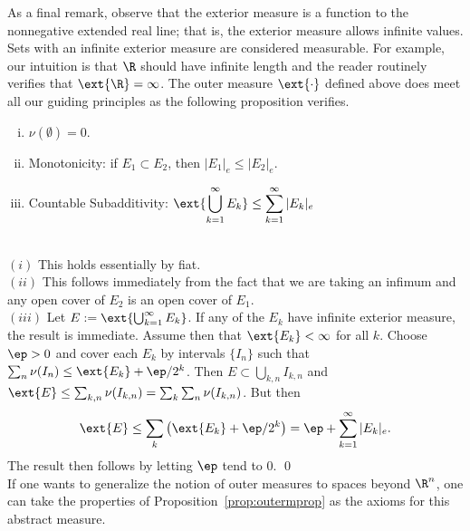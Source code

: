 As a final remark, observe that the exterior measure is a function to the nonnegative extended real line; that is, the exterior measure allows infinite values. Sets with an infinite exterior measure are considered measurable. For example, our intuition is that $\R$ should have infinite length and the reader routinely verifies that $\ext{\R}=\infty$. The outer measure $\ext{\cdot}$ defined above does meet all our guiding principles as the following proposition verifies. 

\begin{prop} \label{prop:outermprop} \hfill
	\begin{enumerate}[(i)]
	\item $\nu(\emptyset)=0$.
	\item Monotonicity: if $E_1 \subset E_2$, then $|E_1|_e \leq |E_2|_e$.
	\item Countable Subadditivity: $\displaystyle \ext{\bigcup_{k=1}^\infty E_k} \leq \sum_{k=1}^\infty |E_k|_e$
	\end{enumerate}
\end{prop}

\pf \\
\noindent$(i)$ This holds essentially by fiat. \\

\noindent$(ii)$ This follows immediately from the fact that we are taking an infimum and any open cover of $E_2$ is an open cover of $E_1$. \\

\noindent$(iii)$ Let $E:=\ext{\bigcup_{k=1}^\infty E_k}$. If any of the $E_k$ have infinite exterior measure, the result is immediate. Assume then that $\ext{E_k}<\infty$ for all $k$. Choose $\ep>0$ and cover each $E_k$ by intervals $\{I_n\}$ such that $\sum_n \nu(I_n) \leq \ext{E_k} + \ep/2^k$. Then $E \subset \bigcup_{k,n} I_{k,n}$ and $\ext{E} \leq \sum_{k,n} \nu(I_{k,n})= \sum_k \sum_n \nu(I_{k,n})$. But then 
	\[
	\ext{E} \leq \sum_k \left( \ext{E_k} + \ep/2^k \right)= \ep + \sum_{k=1}^\infty |E_k|_e.
	\]
The result then follows by letting $\ep$ tend to 0. \qed \\


\noindent If one wants to generalize the notion of outer measures to spaces beyond $\R^n$, one can take the properties of Proposition~\ref{prop:outermprop} as the axioms for this abstract measure. 


